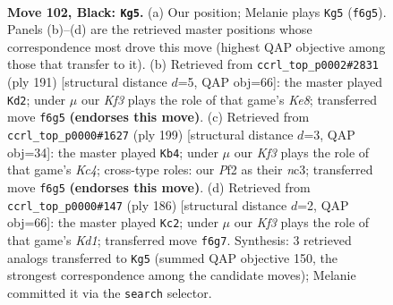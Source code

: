 \documentclass[11pt]{article}
\begin{document}
\clearpage

\begin{figure}[p]\centering
\begin{subfigure}{0.46\textwidth}\centering
\resizebox{\linewidth}{!}{%
\newchessgame
\chessboard[
  setfen={8/8/1R3k2/8/8/7K/5p2/3r4 b - - 19 102},
  showmover=false,
  pgfstyle=straightmove, color=movearrow, markmove={f6-g5}
]}
\caption{}
\end{subfigure}\hfill
\begin{subfigure}{0.46\textwidth}\centering
\resizebox{\linewidth}{!}{%
\newchessgame
\chessboard[
  setfen={8/7r/8/8/4p3/4P3/6K1/R3k3 b - - 13 96},
  showmover=false,
  pgfstyle=straightmove, color=movearrow, markmove={e1-d2}
]}
\caption{}
\end{subfigure}
\\[4pt]
\begin{subfigure}{0.46\textwidth}\centering
\resizebox{\linewidth}{!}{%
\newchessgame
\chessboard[
  setfen={8/8/5K2/R1k5/8/2N5/6r1/8 b - - 4 100},
  showmover=false,
  pgfstyle=straightmove, color=movearrow, markmove={c5-b4}
]}
\caption{}
\end{subfigure}\hfill
\begin{subfigure}{0.46\textwidth}\centering
\resizebox{\linewidth}{!}{%
\newchessgame
\chessboard[
  setfen={1k6/8/8/8/8/2R5/8/3K3r w - - 18 94},
  showmover=false,
  pgfstyle=straightmove, color=movearrow, markmove={d1-c2}
]}
\caption{}
\end{subfigure}
\caption{\textbf{Move 102, Black: \texttt{Kg5}.} (a) Our position; Melanie plays \texttt{Kg5} (\texttt{f6g5}). Panels (b)--(d) are the retrieved master positions whose correspondence most drove this move (highest QAP objective among those that transfer to it). (b) Retrieved from \texttt{ccrl\_top\_p0002\#2831} (ply 191) [structural distance $d$=5, QAP obj=66]: the master played \texttt{Kd2}; under $\mu$ our \emph{Kf3} plays the role of that game's \emph{Ke8}; transferred move \texttt{f6g5} \textbf{(endorses this move)}. (c) Retrieved from \texttt{ccrl\_top\_p0000\#1627} (ply 199) [structural distance $d$=3, QAP obj=34]: the master played \texttt{Kb4}; under $\mu$ our \emph{Kf3} plays the role of that game's \emph{Kc4}; cross-type roles: our \emph{P}f2 as their \emph{n}c3; transferred move \texttt{f6g5} \textbf{(endorses this move)}. (d) Retrieved from \texttt{ccrl\_top\_p0000\#147} (ply 186) [structural distance $d$=2, QAP obj=66]: the master played \texttt{Kc2}; under $\mu$ our \emph{Kf3} plays the role of that game's \emph{Kd1}; transferred move \texttt{f6g7}. Synthesis: 3 retrieved analogs transferred to \texttt{Kg5} (summed QAP objective 150, the strongest correspondence among the candidate moves); Melanie committed it via the \texttt{search} selector.}
\label{fig:thought-m203}
\end{figure}
\end{document}
